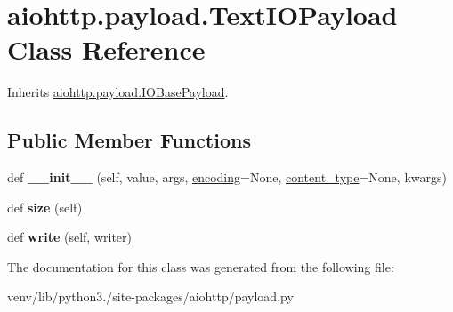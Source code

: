 \hypertarget{classaiohttp_1_1payload_1_1_text_i_o_payload}{}\section{aiohttp.\+payload.\+Text\+I\+O\+Payload Class Reference}
\label{classaiohttp_1_1payload_1_1_text_i_o_payload}


Inherits \hyperlink{classaiohttp_1_1payload_1_1_i_o_base_payload}{aiohttp.\+payload.\+I\+O\+Base\+Payload}.

\subsection*{Public Member Functions}
\begin{DoxyCompactItemize}
\item 
\mbox{\label{classaiohttp_1_1payload_1_1_text_i_o_payload_ad264159b225f81ad4523e087734f8f6e}} 
def {\bfseries \+\_\+\+\_\+init\+\_\+\+\_\+} (self, value, args, \hyperlink{classaiohttp_1_1payload_1_1_payload_a32f545f68c7bf65bee28f566b35edb4e}{encoding}=None, \hyperlink{classaiohttp_1_1payload_1_1_payload_ab7f478716f0cb49905362cc8faf06ec3}{content\+\_\+type}=None, kwargs)
\item 
\mbox{\label{classaiohttp_1_1payload_1_1_text_i_o_payload_aaa17dadd73314371035044505a3d86f9}} 
def {\bfseries size} (self)
\item 
\mbox{\label{classaiohttp_1_1payload_1_1_text_i_o_payload_a532c5327459af38afd1f327d5203e43a}} 
def {\bfseries write} (self, writer)
\end{DoxyCompactItemize}


The documentation for this class was generated from the following file\+:\begin{DoxyCompactItemize}
\item 
venv/lib/python3./site-\/packages/aiohttp/payload.\+py\end{DoxyCompactItemize}

